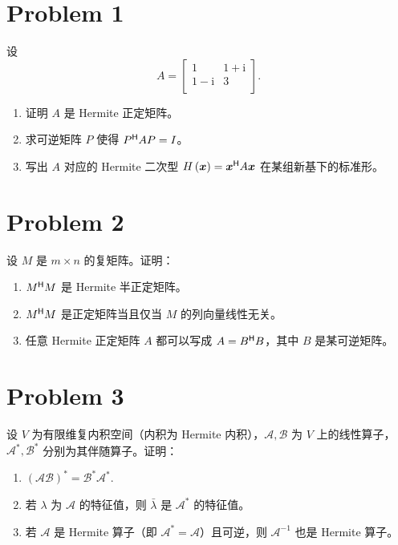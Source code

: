 \section*{Problem 1}

设 \[
A = \begin{bmatrix}
    1 & 1 + \mathrm{i} \\
    1 - \mathrm{i} & 3 \\
\end{bmatrix}.
\]

\begin{enumerate}
    \item 证明 $A$ 是 Hermite 正定矩阵。
    \item 求可逆矩阵 $P$ 使得 $P^{\mathsf{H}} A P = I$。
    \item 写出 $A$ 对应的 Hermite 二次型 $H \left(\bm{x}\right) = \bm{x}^{\mathsf{H}} A \bm{x}$ 在某组新基下的标准形。
\end{enumerate}

\section*{Problem 2}

设 $M$ 是 $m \times n$ 的复矩阵。证明：

\begin{enumerate}
    \item $M^{\mathsf{H}} M$ 是 Hermite 半正定矩阵。
    \item $M^{\mathsf{H}} M$ 是正定矩阵当且仅当 $M$ 的列向量线性无关。
    \item 任意 Hermite 正定矩阵 $A$ 都可以写成 $A = B^{\mathsf{H}} B$，其中 $B$ 是某可逆矩阵。
\end{enumerate}

\section*{Problem 3}

设 $V$ 为有限维复内积空间（内积为 Hermite 内积），$\mathcal{A}, \mathcal{B}$ 为 $V$ 上的线性算子，$\mathcal{A^*}, \mathcal{B^*}$ 分别为其伴随算子。证明：

\begin{enumerate}
    \item $\left(\mathcal{AB}\right)^* = \mathcal{B^*}\mathcal{A^*}.$
    \item 若 $\lambda$ 为 $\mathcal{A}$ 的特征值，则 $\bar\lambda$ 是 $\mathcal{A^*}$ 的特征值。
    \item 若 $\mathcal{A}$ 是 Hermite 算子（即 $\mathcal{A^*} = \mathcal{A}$）且可逆，则 $\mathcal{A}^{-1}$ 也是 Hermite 算子。
\end{enumerate}
